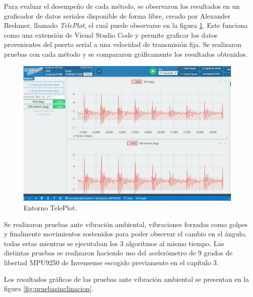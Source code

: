  Para evaluar el desempeño de cada método, se observaron los resultados en un graficador de datos seriales disponible de forma libre, creado por Alexander Brehmer, llamado \textit{TelePlot}, el cual puede observarse en la figura \ref{fig:teleplot}. Este funciona como una extensión de Visual Studio Code y permite graficar los datos provenientes del puerto serial a una velocidad de transmisión fija. Se realizaron pruebas con cada método y se compararon gráficamente los resultados obtenidos. 

 \begin{figure}[H]
    \centering
    \includegraphics[width = \textwidth]{imagenes/cap3_resultados/Pruebas ACL/Inclinacion/Comparacion entre Metodo1 (ACL) y Metodo 2 (Kalman) ante vibraciones.png}
    \caption{Entorno TelePlot.}
    \label{fig:teleplot}
\end{figure}

Se realizaron pruebas ante vibración ambiental, vibraciones forzadas como golpes y finalmente movimientos sostenidos para poder observar el cambio en el ángulo, todas estas mientras se ejecutaban los 3 algoritmos al mismo tiempo. Las distintas pruebas se realizaron haciendo uso del acelerómetro de 9 grados de libertad MPU9250 de Invensense escogido previamente en el capítulo 3. 

Los resultados gráficos de las pruebas ante vibración ambiental se presentan en la figura \ref{fig:pruebasinclinacion}.

